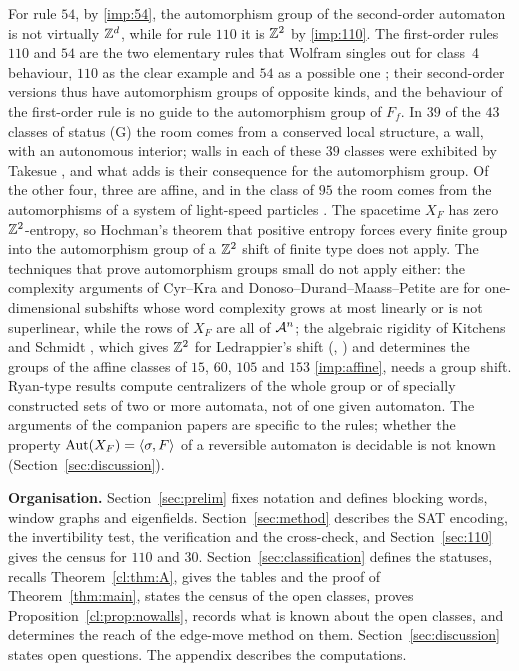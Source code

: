 For rule $54$, by \eqref{imp:54}, the automorphism group of the second-order automaton is not virtually $\mathbb{Z}^d$, while for rule $110$ it is $\mathbb{Z}^2$ by \eqref{imp:110}. The first-order rules $110$ and $54$ are the two elementary rules that Wolfram singles out for class~4 behaviour, $110$ as the clear example and $54$ as a possible one \cite[pp.~693--697]{Wolfram2002}; their second-order versions thus have automorphism groups of opposite kinds, and the behaviour of the first-order rule is no guide to the automorphism group of $F_f$.
In $39$ of the $43$ classes of status (G) the room comes from a conserved local structure, a wall, with an autonomous interior; walls in each of these $39$ classes were exhibited by Takesue \cite[Section~4]{Takesue1989}, and what \cite{PaperC} adds is their consequence for the automorphism group. Of the other four, three are affine, and in the class of $95$ the room comes from the automorphisms of a system of light-speed particles \cite{PaperE}. The spacetime $X_F$ has zero $\mathbb{Z}^2$-entropy, so Hochman's theorem that positive entropy forces every finite group into the automorphism group of a $\mathbb{Z}^2$ shift of finite type \cite{Hochman2010} does not apply. The techniques that prove automorphism groups small do not apply either: the complexity arguments of Cyr--Kra and Donoso--Durand--Maass--Petite \cite{CK2015,DDMP2016} are for one-dimensional subshifts whose word complexity grows at most linearly or is not superlinear, while the rows of $X_F$ are all of $\mathcal{A}^n$; the algebraic rigidity of Kitchens and Schmidt \cite{KS1989,KS2000}, which gives $\mathbb{Z}^2$ for Ledrappier's shift \cite{Ledrappier1978} (\cite{Ward1994}, \cite[Theorem~7]{BRY2018}) and determines the groups of the affine classes of $15$, $60$, $105$ and $153$ \eqref{imp:affine}, needs a group shift. Ryan-type results \cite{Ryan1972,Salo2019Ryan,Kopra2022} compute centralizers of the whole group or of specially constructed sets of two or more automata, not of one given automaton. The arguments of the companion papers are specific to the rules; whether the property $\operatorname{Aut}(X_F)=\langle\sigma,F\rangle$ of a reversible automaton is decidable is not known (Section~\ref{sec:discussion}).

\medskip
\noindent\textbf{Organisation.} Section~\ref{sec:prelim} fixes notation and defines blocking words, window graphs and eigenfields. Section~\ref{sec:method} describes the SAT encoding, the invertibility test, the verification and the cross-check, and Section~\ref{sec:110} gives the census for $110$ and $30$. Section~\ref{sec:classification} defines the statuses, recalls Theorem~\ref{cl:thm:A}, gives the tables and the proof of Theorem~\ref{thm:main}, states the census of the open classes, proves Proposition~\ref{cl:prop:nowalls}, records what is known about the open classes, and determines the reach of the edge-move method on them. Section~\ref{sec:discussion} states open questions. The appendix describes the computations.
